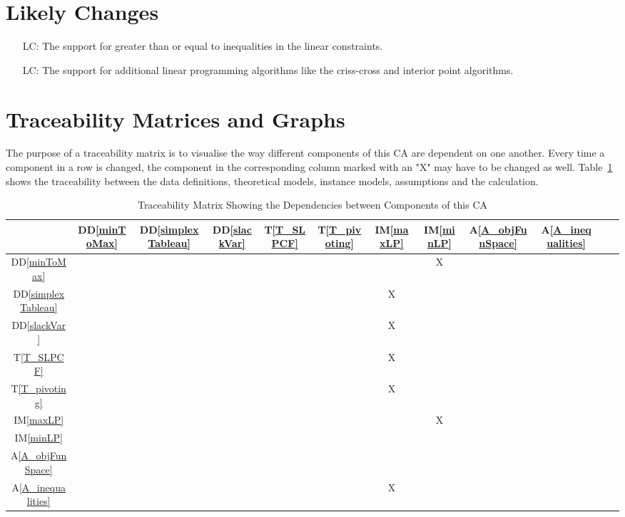 \documentclass[12pt]{article}
\newcommand{\ddref}[1]{DD\ref{#1}}
\newcommand{\tref}[1]{T\ref{#1}}
\newcommand{\aref}[1]{A\ref{#1}}
\newcommand{\iref}[1]{IM\ref{#1}}
\newcounter{lcnum} %
\begin{document}
\section{Likely Changes} \label{Sec_LikelyChanges} 

\noindent 
\begin{itemize}
	\item[LC\refstepcounter{lcnum}\thelcnum\label{LC_inequalities}:] The 
	support for greater than or equal to inequalities in the linear constraints.
	
	\item[LC\refstepcounter{lcnum}\thelcnum\label{LC_moreAlgorithms}:] The 
	support for additional linear programming algorithms like the criss-cross 
	and interior point algorithms. 
\end{itemize}

\section{Traceability Matrices and Graphs} \label{Sec_TraceabilityMatrix}

The purpose of a traceability matrix is to visualise the way different 
components of this CA are dependent on one another. Every time a component in a 
row is changed, the component in the corresponding column marked with an "X" 
may have to be changed as well.  Table~\ref{Table_traceability1} shows the 
traceability between the data definitions, theoretical models, instance models, 
assumptions and the calculation.

\begin{table}[h!]
	\centering
	\begin{tabular}{|c|c|c|c|c|c|c|c|c|c|c|c|}
		\hline        
		& \ddref{minToMax} & \ddref{simplexTableau} & \ddref{slackVar} & 
		\tref{T_SLPCF} & \tref{T_pivoting} & \iref{maxLP} & 
		\iref{minLP} & \aref{A_objFunSpace} & \aref{A_inequalities} \\
		\hline
		\ddref{minToMax} 	    &   &   &   &   &   &   & X &   &  \\
		\hline
		\ddref{simplexTableau}  &   &   &   &   &   & X &   &   &  \\ 
		\hline
		\ddref{slackVar} 		&   &   &   &   &   & X &   &   &  \\ 
		\hline
		\tref{T_SLPCF} 	  		&   &   &   &   &   & X &   &   &  \\ 
		\hline  
		\tref{T_pivoting} 		&   &   &   &   &   & X &   &   &  \\ 
		\hline
		\iref{maxLP} 	  		&   &   &   &   &   &   & X &   &  \\ 
		\hline
		\iref{minLP}   			&   &   &   &   &   &   &   &   &  \\ 
		\hline
		\aref{A_objFunSpace}	&   &   &   &   &   &   &   &   &  \\
		\hline 
		\aref{A_inequalities} 	&   &   &   &   &   & X &   &   &  \\
		\hline
	\end{tabular}
	\caption{Traceability Matrix Showing the Dependencies between Components of 
	this CA}
	\label{Table_traceability1}
\end{table}
\end{document}
